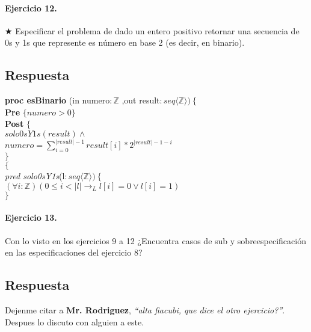 \documentclass[a4paper]{article}
\begin{document}
\paragraph*{Ejercicio 12.}$\bigstar$ Especificar el problema de dado un entero positivo retornar una secuencia de 0s y 1s que represente es número en base 2 (es decir, en binario).
\subsection*{Respuesta}

			\textbf{proc esBinario }(in numero$:\mathbb{Z}$
				,out result$:seq\langle \mathbb{Z}\rangle )\ \{$\smallskip \\
			\hspace*{6mm} \textbf{Pre }$\{ numero >0\}$\smallskip \\
			\hspace*{6mm} \textbf{Post }$\{$\\
			\hspace*{6mm} $solo0sY1s(result)\wedge$\\
			\hspace*{6mm} $numero=\sum_{i=0}^{|result|-1}result[i]*2^{|result|-1-i}$\\
			\hspace*{6mm} $\}$\\
			$\{$\smallskip \\
			
			\textit{pred solo0sY1s}(l$: seq\langle \mathbb{Z}\rangle)\ \{$\smallskip \\
			\hspace*{6mm}$(\forall i:\mathbb{Z})(0\leq i< |l|\rightarrow_L l[i]=0\vee l[i]=1)$\\
			$\}$
\paragraph*{Ejercicio 13.} Con lo visto en los ejercicios 9 a 12 ¿Encuentra casos de sub y sobreespecificación en las especificaciones del ejercicio 8?
\subsection*{Respuesta}
Dejenme citar a \textbf{Mr. Rodriguez}, \textit{``alta fiacubi, que dice el otro ejercicio?''}.
Despues lo discuto con alguien a este.
	
\end{document}

